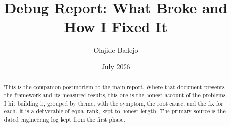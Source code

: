 \documentclass[11pt]{article}
\title{Debug Report: What Broke and How I Fixed It}
\author{Olajide Badejo}
\date{July 2026}
\begin{document}
\maketitle

\begin{abstract}
This is the companion postmortem to the main report. Where that document
presents the framework and its measured results, this one is the honest account
of the problems I hit building it, grouped by theme, with the symptom, the root
cause, and the fix for each. It is a deliverable of equal rank, kept to honest
length. The primary source is the dated engineering log kept from the first
phase.
\end{abstract}

\newpage
\tableofcontents
\newpage






\end{document}
